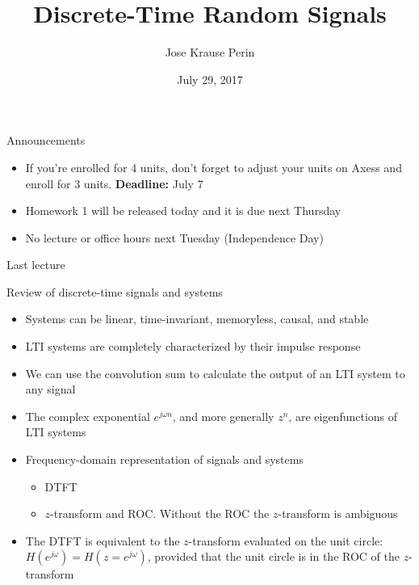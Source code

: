 \documentclass[10pt]{beamer}
\title[EE 264]{Discrete-Time Random Signals}
\author{Jose Krause Perin}
\institute{Stanford University}
\date{July 29, 2017}
\begin{document}
\begin{frame}
  \titlepage
\end{frame}


\begin{frame}{Announcements}

\begin{itemize}
	\item If you're enrolled for 4 units, don't forget to adjust your units on Axess and enroll for 3 units. \textbf{Deadline:} July 7
	\item Homework 1 will be released today and it is due next Thursday
	\item No lecture or office hours next Tuesday (Independence Day)
\end{itemize}

\end{frame}

\begin{frame}{Last lecture}

\begin{block}{Review of discrete-time signals and systems}
	\begin{itemize}
		\item Systems can be linear, time-invariant, memoryless, causal, and stable \\
		\item LTI systems are completely characterized by their impulse response \\
		\item We can use the convolution sum to calculate the output of an LTI system to any signal \\
		\item The complex exponential $e^{j\omega n}$, and more generally $z^n$, are eigenfunctions of LTI systems
		\item Frequency-domain representation of signals and systems
		\begin{itemize}
			\item DTFT
			\item $z$-transform and ROC. Without the ROC the $z$-transform is ambiguous
		\end{itemize}
		\item The DTFT is equivalent to the $z$-transform evaluated on the unit circle: $H(e^{j\omega}) = H(z = e^{j\omega})$, provided that the unit circle is in the ROC of the $z$-transform
	\end{itemize}
\end{block}

\end{frame}
\end{document}

